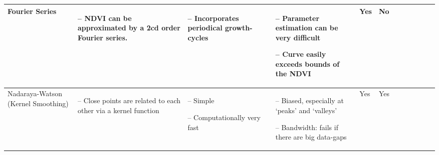 \begin{table}[!ht]
\begin{tabular}{p{1.6cm}p{3.3cm}p{3.3cm}p{3.4cm}p{0.4cm}p{0.4cm}p{3cm}p{3cm}p{3cm}p{3cm}p{2.7cm}p{3cm}|}
		Fourier Series                                                                                                                                              &
		\begin{cptitemize} \item[--]  NDVI can be approximated by a 2cd order Fourier series.                            \end{cptitemize}        &
		\begin{cptitemize} \item[--]  Incorporates periodical growth-cycles                                 \end{cptitemize}        &
		\begin{cptitemize} \item[--]  Parameter estimation can be very difficult \item[--]  Curve easily exceeds bounds of the NDVI             \end{cptitemize}        &
		Yes                                                                                                                                                          &
		No                                                                                                                                                         \\ \hline%

		Nadaraya-Watson (Kernel Smoothing)                                                                                                                                  &
		\begin{cptitemize} \item[--]  Close points are related to each other via a kernel function \end{cptitemize}                                                                                                                                                            &
		\begin{cptitemize} \item[--]  Simple  \item[--]  Computationally very fast                                                             \end{cptitemize}        &
		\begin{cptitemize} \item[--]  Biased, especially at `peaks' and `valleys'   \item[--]  Bandwidth: fails if there are big data-gaps                                                     \end{cptitemize}               &
		Yes                                                                                                                                                          &
		Yes                                                                                                                                                            \\ \hline%


\end{tabular}
\end{table}

